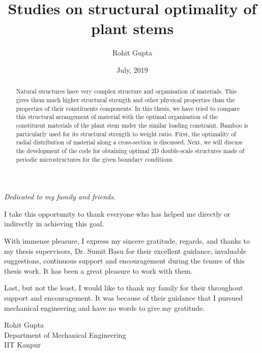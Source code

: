 \documentclass[openright,twoside]{iitkthesis}
\begin{document}

\title{Studies on structural optimality of plant stems}
\author{Rohit Gupta}
\date{July, 2019}


\thesis
{}

\maketitle

\makecertificate

\begin{dedication}
\textit{Dedicated to my family and friends.} 
\end{dedication}

\begin{abstract}
Natural structures have very complex structure and organisation of materials. This gives them much higher structural strength and other physical properties than the properties of their constituents components. In this thesis, we have tried to compare this structural arrangement of material with the optimal organisation of the constituent materials of the plant stem under the similar loading constraint. Bamboo is particularly used for its structural strength to weight ratio. First, the optimality of radial distribution of material along a cross-section is discussed. Next, we will discuss the development of the code for obtaining optimal 2D double-scale structures made of periodic microstructures for the given boundary conditions.
\end{abstract}

\begin{acknowledgments}

I take this opportunity to thank everyone who has helped me directly or indirectly in achieving this goal. 

With immense pleasure, I express my sincere gratitude, regards, and thanks to my thesis supervisors, Dr. Sumit Basu for their excellent guidance, invaluable suggestions, continuous support and encouragement during the tenure of this thesis work. It has been a great pleasure to work with them. 

Last, but not the least, I would like to thank my family for their throughout support and encouragement. It was because of their guidance that I pursued mechanical engineering and have no words to give my gratitude. 

\begin{flushright}
Rohit Gupta
\\Department of Mechanical Engineering
\\IIT Kanpur
\end{flushright}

\end{acknowledgments}
\end{document}
